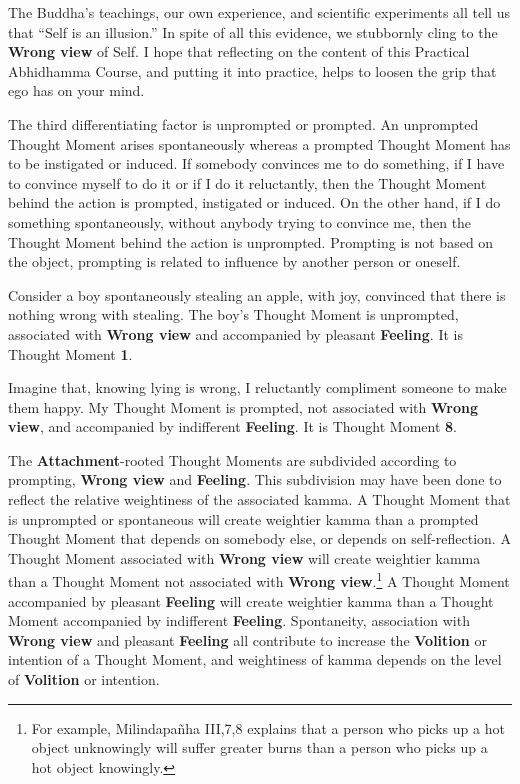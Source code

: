 The Buddha’s teachings, our own experience, and scientific experiments all tell us that “Self is an illusion.” In spite of all this evidence, we stubbornly cling to the \textbf{Wrong view} of Self. I hope that reflecting on the content of this Practical Abhidhamma Course, and putting it into practice, helps to loosen the grip that ego has on your mind.

The third differentiating factor is unprompted or prompted. An unprompted Thought Moment arises spontaneously whereas a prompted Thought Moment has to be instigated or induced. If somebody convinces me to do something, if I have to convince myself to do it or if I do it reluctantly, then the Thought Moment behind the action is prompted, instigated or induced. On the other hand, if I do something spontaneously, without anybody trying to convince me, then the Thought Moment behind the action is unprompted. Prompting is not based on the object, prompting is related to influence by another person or oneself.

Consider a boy spontaneously stealing an apple, with joy, convinced that there is nothing wrong with stealing. The boy’s Thought Moment is unprompted, associated with \textbf{Wrong view} and accompanied by pleasant \textbf{Feeling}. It is Thought Moment \textbf{1}.

Imagine that, knowing lying is wrong, I reluctantly compliment someone to make them happy. My Thought Moment is prompted, not associated with \textbf{Wrong view}, and accompanied by indifferent \textbf{Feeling}. It is Thought Moment \textbf{8}.

The \textbf{Attachment}-rooted Thought Moments are subdivided according to prompting, \textbf{Wrong view} and \textbf{Feeling}. This subdivision may have been done to reflect the relative weightiness of the associated kamma. A Thought Moment that is unprompted or spontaneous will create weightier kamma than a prompted Thought Moment that depends on somebody else, or depends on self-reflection. A Thought Moment associated with \textbf{Wrong view} will create weightier kamma than a Thought Moment not associated with \textbf{Wrong view}.\footnote{For example, Milindapañha III,7,8 explains that a person who picks up a hot object unknowingly will suffer greater burns than a person who picks up a hot object knowingly.} A Thought Moment accompanied by pleasant \textbf{Feeling} will create weightier kamma than a Thought Moment accompanied by indifferent \textbf{Feeling}. Spontaneity, association with \textbf{Wrong view} and pleasant \textbf{Feeling} all contribute to increase the \textbf{Volition} or intention of a Thought Moment, and weightiness of kamma depends on the level of \textbf{Volition} or intention.

